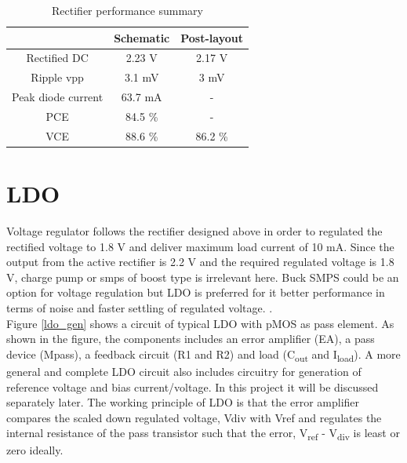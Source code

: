 \documentclass[12pt,a4paper,UKenglish]{article}
\begin{document}
\begin{table}[H]
\caption{Rectifier performance summary}
\begin{center}
\begin{tabular}{c|c|c}
\hline \hline
				 & \textbf{Schematic}		& \textbf{Post-layout} \\
\hline \hline
Rectified DC	 	& 2.23 V 				& 2.17 V	\\ \hline
Ripple \acrshort{vpp} & 3.1 mV 				& 3 mV	\\ \hline
Peak diode current 	& 63.7 mA 			&	-	\\ \hline
PCE 				& 84.5 \% 				&	-	\\ \hline
VCE 				& 88.6 \% 				&	86.2 \%	\\
\hline \hline
\end{tabular}
\end{center}
\label{tab:rect_spec}
\end{table}


\clearpage
\newpage

\section{LDO}

Voltage regulator follows the rectifier designed above in order to regulated the rectified voltage to 1.8 V and 
deliver maximum load current of 10 mA. Since the output from the active rectifier is 2.2 V and the required 
regulated voltage is 1.8 V, charge pump or  \acrshort{smps} of boost type is irrelevant here. Buck SMPS could be 
an option for voltage regulation but LDO is preferred for it better performance in terms of noise and faster 
settling of regulated voltage.  \cite{ldo_psu}.\\ 

Figure \ref{ldo_gen} shows a circuit of typical LDO with pMOS as pass element. As shown in the figure, the 
components includes an error amplifier (EA), a pass device (Mpass), a feedback circuit (R1 and R2) and load 
(C\textsubscript{out} and I\textsubscript{load}). A more general and complete LDO circuit also includes 
circuitry for generation of reference voltage and bias current/voltage. In this project it will be discussed 
separately later. The working principle of LDO is that the error amplifier compares the scaled down regulated 
voltage, Vdiv with Vref and regulates the internal resistance of the pass transistor such that  the error, 
V\textsubscript{ref} - V\textsubscript{div} is least or zero ideally. \\
\end{document}
